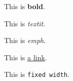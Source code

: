 
  This is \textbf{bold}.

  This is \textit{textit}.

  This is \emph{emph}.

  This is \href{https://www.example.com}{a link}.

  This is \texttt{fixed width}.

